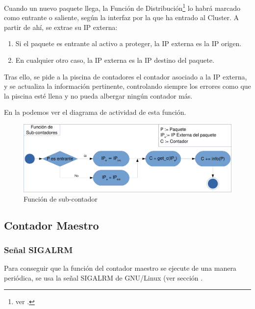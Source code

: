 Cuando un nuevo paquete llega, la Función de Distribución\footnote{ver .} lo habrá marcado como 
entrante o saliente, según la interfaz por la que ha entrado al Cluster. A partir de ahí, se extrae su \gls{IP} externa:

\begin{enumerate}
 \item Si el paquete es entrante al activo a proteger, la \gls{IP} externa es la \gls{IP} origen.
 \item En cualquier otro caso, la IP externa es la \gls{IP} destino del paquete.
\end{enumerate}

Tras ello, se pide a la piscina de contadores el contador asociado a la IP externa, y se actualiza la información 
pertinente, controlando siempre los errores como que la piscina esté llena y no pueda albergar ningún contador más.

En la  podemos ver el diagrama de actividad de esta función.

\begin{figure}[htbp]
\centering
\includegraphics[width=\textwidth]{CapituloEstructura/Figuras/ActividadFuncionContador-crop}
\caption{Función de sub-contador}
\end{figure}
%

\subsection{Contador Maestro}
\subsubsection{Señal SIGALRM}
Para conseguir que la función del contador maestro se ejecute de una manera periódica, se usa la señal 
SIGALRM de GNU/Linux (ver sección .

